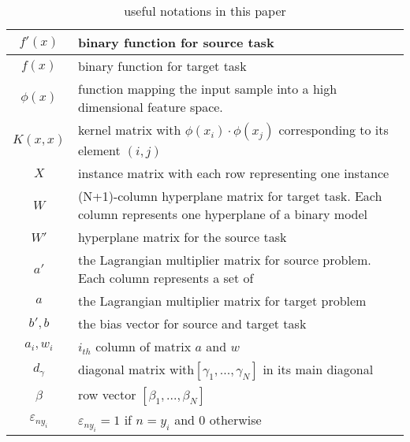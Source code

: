 \begin{table}[htbp]
  \centering
  \caption{useful notations in this paper}
    \begin{tabular}{|c|L{7cm}|}
    \hline
    $f'(x)$ & binary function for source task \\
    \hline
    $f(x)$  & binary function for target task \\
    \hline
    $\phi(x)$ &  function mapping the input sample into a high dimensional feature space. \\ \hline
    $K(x,x)$ & kernel matrix with  $\phi(x_i) \cdot\phi(x_j)$ corresponding to its element $(i,j)$\\ \hline
    $X$     & instance matrix with each row representing one instance \\\hline
    $W $    & (N+1)-column hyperplane matrix for target task. Each column represents one hyperplane of a binary model \\\hline
    $W'$    & hyperplane matrix for the source task \\\hline
    $a' $   & the Lagrangian multiplier matrix for source problem. Each column represents a set of  \\\hline
    $a $    & the Lagrangian multiplier matrix for target problem \\
    \hline
    $b',b$  & the bias vector for source and target task \\
        \hline
    $a_i,w_i$ & $i_{th}$ column of matrix $a$ and $w$\\\hline
    $d_\gamma$ &  diagonal matrix with$\left[ {{\gamma _1},...,{\gamma _N}} \right]$ in its main diagonal\\\hline
    $\beta$ & row vector $\left[ {{\beta _1},...,{\beta _N}} \right]$\\ \hline
    $\varepsilon_{ny_i}$&$\varepsilon _{n{y_i}}=1$ if $n=y_i$ and 0 otherwise\\ \hline
    \end{tabular}%
  \label{tab:notation}%
\end{table}%

 

